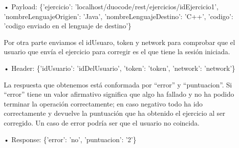 \begin{itemize}
\item[•]
Payload: 
\{'ejercicio': 'localhost/duocode/rest/ejercicios/idEjercicio1', 'nombreLenguajeOrigien': 'Java', 'nombreLenguajeDestino': 'C++', 'codigo': 'codigo enviado en el lenguaje de destino'\} 
\vspace{1em}

Por otra parte enviamos el idUsuaro, token y network para comprobar que el usuario que envía el ejercicio para corregir es el que tiene la sesión iniciada.
\item[•]
Header: \{'idUsuario': 'idDelUsuario', 'token': 'token', 'network': 'network'\}
\vspace{1em}

La respuesta que obtenemos está conformada por “error” y “puntuacion”. Si “error” tiene un valor afirmativo significa que algo ha fallado y no ha podido terminar la operación correctamente; en caso negativo todo ha ido correctamente y devuelve la puntuación que ha obtenido el ejercicio al ser corregido. Un caso de error podría ser que el usuario no coincida.
\item[•]
Response: \{'error': 'no', 'puntuacion': '2'\}
\end{itemize}
